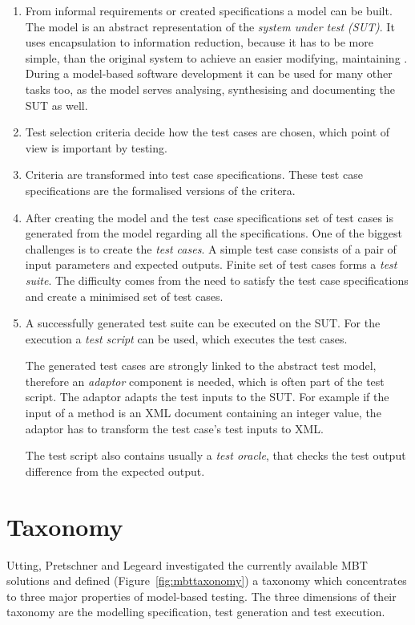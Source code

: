 \begin{enumerate}
    \item From informal requirements or created specifications a model can be built. The model is an abstract representation of the \textit{system under test (SUT)}. It uses encapsulation to information reduction, because it has to be more simple, than the original system to achieve an easier modifying, maintaining \cite{mbttestcasegeneration}. During a model-based software development it can be used for many other tasks too, as the model serves analysing, synthesising and documenting the SUT as well.
     \item Test selection criteria decide how the test cases are chosen, which point of view is important by testing.
     \item Criteria are transformed into test case specifications. These test case specifications are the formalised versions of the critera.
     \item After creating the model and the test case specifications set of test cases is generated from the model regarding all the specifications. One of the biggest challenges is to create the \textit{test cases}. A simple test case consists of a pair of input parameters and expected outputs. Finite set of test cases forms a \textit{test suite}. The difficulty comes from the need to satisfy the test case specifications and create a minimised set of test cases.
     \item A successfully generated test suite can be executed on the SUT. For the execution a \textit{test script} can be used, which executes the test cases.
     
     The generated test cases are strongly linked to the abstract test model, therefore an \textit{adaptor} component is needed, which is often part of the test script. The adaptor adapts the test inputs to the SUT. For example if the input of a method is an XML document containing an integer value, the adaptor has to transform the test case's test inputs to XML.
     
     The test script also contains usually a \textit{test oracle}, that checks the test output difference from the expected output.
\end{enumerate}

\section{Taxonomy}
\label{sec:taxonomy}

Utting, Pretschner and Legeard investigated the currently available MBT solutions and defined (Figure~\ref{fig:mbttaxonomy}) a taxonomy which concentrates to three major properties of model-based testing. The three dimensions of their taxonomy are the modelling specification, test generation and test execution.

